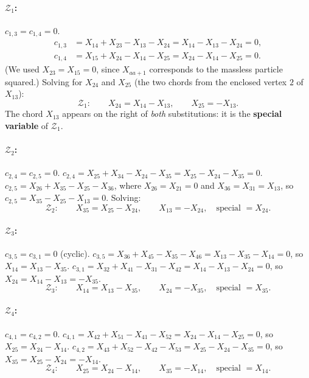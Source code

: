 \documentclass[11pt]{article}
\newcommand{\X}[2]{X_{#1#2}}
\newcommand{\Z}{\mathcal{Z}}
\theoremstyle{definition}
\begin{document}
\paragraph{$\Z_1$:} $c_{1,3}=c_{1,4}=0$.
\begin{align*}
c_{1,3}&=\X{1}{4}+\X{2}{3}-\X{1}{3}-\X{2}{4}=\X{1}{4}-\X{1}{3}-\X{2}{4}=0,\\
c_{1,4}&=\X{1}{5}+\X{2}{4}-\X{1}{4}-\X{2}{5}=\X{2}{4}-\X{1}{4}-\X{2}{5}=0.
\end{align*}
(We used $\X{2}{3}=\X{1}{5}=0$, since $\X{a}{a+1}$ corresponds to the
massless particle squared.) Solving for $\X{2}{4}$ and $\X{2}{5}$ (the two
chords from the enclosed vertex $2$ of $\X{1}{3}$):
\begin{equation}
\Z_1:\qquad\boxed{\X{2}{4}=\X{1}{4}-\X{1}{3},\qquad \X{2}{5}=-\X{1}{3}.}
\end{equation}
The chord $\X{1}{3}$ appears on the right of \emph{both} substitutions: it
is the \textbf{special variable} of $\Z_1$.

\paragraph{$\Z_2$:} $c_{2,4}=c_{2,5}=0$.
$c_{2,4}=\X{2}{5}+\X{3}{4}-\X{2}{4}-\X{3}{5}=\X{2}{5}-\X{2}{4}-\X{3}{5}=0$.
$c_{2,5}=\X{2}{6}+\X{3}{5}-\X{2}{5}-\X{3}{6}$, where $\X{2}{6}=\X{2}{1}=0$
and $\X{3}{6}=\X{3}{1}=\X{1}{3}$, so $c_{2,5}=\X{3}{5}-\X{2}{5}-\X{1}{3}=0$.
Solving:
\begin{equation}
\Z_2:\qquad\boxed{\X{3}{5}=\X{2}{5}-\X{2}{4},\qquad \X{1}{3}=-\X{2}{4}}, \quad\text{special }=\X{2}{4}.
\end{equation}

\paragraph{$\Z_3$:} $c_{3,5}=c_{3,1}=0$ (cyclic).
$c_{3,5}=\X{3}{6}+\X{4}{5}-\X{3}{5}-\X{4}{6}=\X{1}{3}-\X{3}{5}-\X{1}{4}=0$, so
$\X{1}{4}=\X{1}{3}-\X{3}{5}$.
$c_{3,1}=\X{3}{2}+\X{4}{1}-\X{3}{1}-\X{4}{2}=\X{1}{4}-\X{1}{3}-\X{2}{4}=0$, so
$\X{2}{4}=\X{1}{4}-\X{1}{3}=-\X{3}{5}$.
\begin{equation}
\Z_3:\qquad\boxed{\X{1}{4}=\X{1}{3}-\X{3}{5},\qquad \X{2}{4}=-\X{3}{5}}, \quad\text{special }=\X{3}{5}.
\end{equation}

\paragraph{$\Z_4$:} $c_{4,1}=c_{4,2}=0$.
$c_{4,1}=\X{4}{2}+\X{5}{1}-\X{4}{1}-\X{5}{2}=\X{2}{4}-\X{1}{4}-\X{2}{5}=0$, so $\X{2}{5}=\X{2}{4}-\X{1}{4}$.
$c_{4,2}=\X{4}{3}+\X{5}{2}-\X{4}{2}-\X{5}{3}=\X{2}{5}-\X{2}{4}-\X{3}{5}=0$, so $\X{3}{5}=\X{2}{5}-\X{2}{4}=-\X{1}{4}$.
\begin{equation}
\Z_4:\qquad\boxed{\X{2}{5}=\X{2}{4}-\X{1}{4},\qquad \X{3}{5}=-\X{1}{4}}, \quad\text{special }=\X{1}{4}.
\end{equation}
\end{document}
